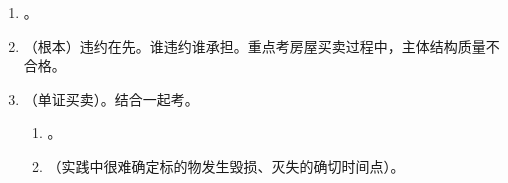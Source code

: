 \begin{enumerate}
\begin{enumerate}
                \begin{enumerate}
                  \item {}。房屋 + 买卖。
                        \begin{enumerate}
                          \item 交付（债） \dui\, + 登记（物） \cuo\, \yjt 风险转移 \yjt 有债无物。
                          \item {}。
                          \item 交付 \dui\, + 登记 \dui\, \yjt 风险转移、所有权转移 \yjt 有债有物。
                        \end{enumerate}
                  \item 动产。合一主义，。考例外。
                        \begin{enumerate}
                          \item {}。
                          \item 无约定。（）、单据 、加盖标记 、通知买受人 \yjt {}。
                                。
                          \item 被撤销的买卖合同。所有权不发生变动，标的物如已交付，风险买方承担（有保管义务）。
                        \end{enumerate}
                \end{enumerate}
          \item {}。
          \item （根本）违约在先。谁违约谁承担。重点考房屋买卖过程中，主体结构质量不合格。
          \item {}（单证买卖）。结合一起考。
                \begin{enumerate}
                  \item {}。
                  \item {}（实践中很难确定标的物发生毁损、灭失的确切时间点）。
                \end{enumerate}
        \end{enumerate}
        

\end{enumerate}

